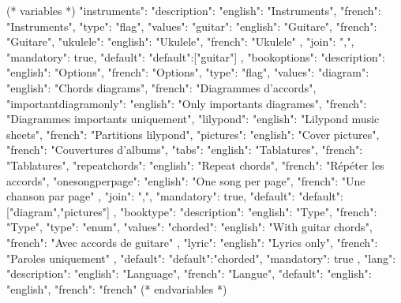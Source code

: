 
(* variables *)
{
"instruments": {"description": {"english": "Instruments", "french": "Instruments"},
               "type": "flag",
               "values": {"guitar": {"english": "Guitare", "french": "Guitare"},
                          "ukulele": {"english": "Ukulele", "french": "Ukulele"}
                         },
               "join": ",",
               "mandatory": true,
               "default": {"default":["guitar"]}
            },
"bookoptions": {"description": {"english": "Options", "french": "Options"},
               "type": "flag",
               "values": {"diagram": {"english": "Chords diagrams", "french": "Diagrammes d'accords"},
                          "importantdiagramonly": {"english": "Only importants diagrames", "french": "Diagrammes importants uniquement"},
                          "lilypond": {"english": "Lilypond music sheets", "french": "Partitions lilypond"},
                          "pictures": {"english": "Cover pictures", "french": "Couvertures d'albums"},
                          "tabs": {"english": "Tablatures", "french": "Tablatures"},
                          "repeatchords": {"english": "Repeat chords", "french": "Répéter les accords"},
                          "onesongperpage": {"english": "One song per page", "french": "Une chanson par page"}
                       },
               "join": ",",
               "mandatory": true,
               "default": {"default":["diagram","pictures"]}
            },
"booktype": {"description": {"english": "Type", "french": "Type"},
            "type": "enum",
            "values": {"chorded": {"english": "With guitar chords", "french": "Avec accords de guitare" },
                                   "lyric": {"english": "Lyrics only", "french": "Paroles uniquement"}
                     },
            "default": {"default":"chorded"},
            "mandatory": true
            },
"lang": {"description": {"english": "Language", "french": "Langue"},
         "default": {"english": "english", "french": "french"}
      }
}
(* endvariables *)

